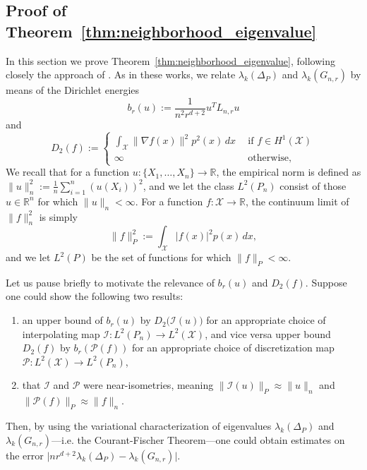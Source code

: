 \documentclass[twoside]{article}
\newcommand{\Reals}{\mathbb{R}}
\newcommand{\1}{\mathbf{1}}
\newcommand{\Lap}{L}
\newcommand{\Xset}{\mathcal{X}}
\newcommand{\Leb}{L}
\newcommand{\mc}[1]{\mathcal{#1}}
\theoremstyle{definition}
\theoremstyle{remark}
\begin{document}
\subsection{Proof of Theorem~\ref{thm:neighborhood_eigenvalue}}

In this section we prove Theorem~\ref{thm:neighborhood_eigenvalue}, following closely the approach of \citep{burago2014,trillos2019,calder2019}. As in these works, we relate $\lambda_k(\Delta_P)$ and $\lambda_k(G_{n,r})$ by means of the Dirichlet energies
\begin{equation*}
b_r(u) := \frac{1}{n^2 r^{d+ 2}}u^T \Lap_{n,r} u 
\end{equation*}
and
\begin{equation*}
D_2(f) :=
\begin{cases*}
\int_{\Xset} \|\nabla f(x)\|^2 p^2(x) \,dx~~ &\textrm{if $f \in H^1(\Xset)$} \\
\infty~~ & \textrm{otherwise,}
\end{cases*}
\end{equation*}
We recall that for a function $u: \{X_1,\ldots,X_n\} \to \Reals$, the empirical norm is defined as $\|u\|_n^2 := \frac{1}{n} \sum_{i = 1}^{n} (u(X_i))^2$, and we let the class $\Leb^2(P_n)$ consist of those $u \in \Reals^n$ for which $\|u\|_{n} < \infty$. For a function $f: \Xset \to \Reals$, the continuum limit of $\|f\|_n^2$ is simply
\begin{equation*}
\|f\|_{P}^2 := \int_{\Xset} \bigl|f(x)\bigr|^2 p(x) \,dx,
\end{equation*} 
and we let $\Leb^2(P)$ be the set of functions for which $\|f\|_P < \infty$.

Let us pause briefly to motivate the relevance of $b_r(u)$ and $D_2(f)$. Suppose one could show the following two results: 
\begin{enumerate}[(1)]
	\item an upper bound of $b_r(u)$ by $D_2\bigl(\mc{I}(u)\bigr)$ for an appropriate choice of interpolating map $\mc{I}: \Leb^2(P_n) \to \Leb^2(\mc{X})$, and vice versa upper bound $D_2(f)$ by $b_r(\mc{P}(f))$ for an appropriate choice of discretization map $\mc{P}: \Leb^2(\mc{X}) \to \Leb^2(P_n)$,
	\item that $\mc{I}$ and $\mc{P}$ were near-isometries, meaning $\|\mc{I}(u)\|_{P} \approx \|u\|_{n}$ and $\|\mc{P}(f)\|_{P} \approx \|f\|_{n}$.
\end{enumerate}
Then, by using the variational characterization of eigenvalues $\lambda_k(\Delta_P)$ and $\lambda_k(G_{n,r})$---i.e. the Courant-Fischer Theorem---one could obtain estimates on the error $\bigl|nr^{d + 2}\lambda_k(\Delta_P) - \lambda_k(G_{n,r})\bigr|$.
\end{document}
